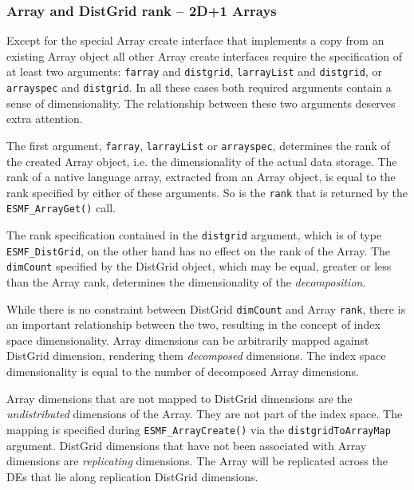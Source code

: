 
  
   \subsubsection{Array and DistGrid rank -- 2D+1 Arrays}
  
   Except for the special Array create interface that implements a copy from
   an existing Array object all other Array create interfaces require the 
   specification of at least two arguments: {\tt farray} and {\tt distgrid},
   {\tt larrayList} and {\tt distgrid}, or {\tt arrayspec} and {\tt distgrid}.
   In all these cases both required arguments contain a sense of dimensionality.
   The relationship between these two arguments deserves extra attention.
  
   The first argument, {\tt farray}, {\tt larrayList} or {\tt arrayspec}, 
   determines the rank of the created Array object, i.e. the dimensionality
   of the actual data storage. The rank of a native language array, extracted 
   from an Array object, is equal to the rank specified by either of these
   arguments. So is the {\tt rank} that is returned by the {\tt ESMF\_ArrayGet()}
   call.
  
   The rank specification contained in the {\tt distgrid} argument, which is of 
   type {\tt ESMF\_DistGrid}, on the other hand has no effect on the
   rank of the Array. The {\tt dimCount} specified by the DistGrid object,
   which may be equal, greater or less than the Array rank, determines the 
   dimensionality of the {\em decomposition}.
  
   While there is no constraint between DistGrid {\tt dimCount} and Array
   {\tt rank}, there is an important relationship between the two, resulting in
   the concept of index space dimensionality. Array dimensions can be
   arbitrarily mapped against DistGrid dimension, rendering them {\em decomposed}
   dimensions. The index space dimensionality is equal to the number of 
   decomposed Array dimensions.
  
   \begin{sloppypar}
   Array dimensions that are not mapped to DistGrid dimensions are the 
   {\em undistributed} dimensions of the Array. They are not part
   of the index space. The mapping is specified during {\tt ESMF\_ArrayCreate()}
   via the {\tt distgridToArrayMap} argument. DistGrid dimensions that have
   not been associated with Array dimensions are {\em replicating} dimensions.
   The Array will be replicated across the DEs that lie along replication
   DistGrid dimensions.
   \end{sloppypar}
  
